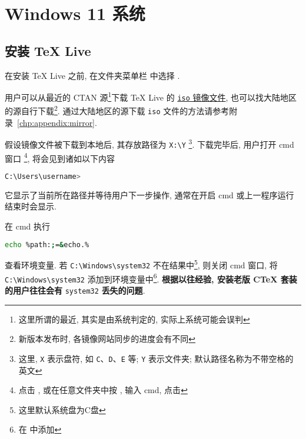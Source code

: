 
\chapter{Windows 11 系统}

\section{安装 \TeX{} Live}\label{sec:windows:install}

在安装 \TeX{} Live 之前,
在文件夹菜单栏  中选择 .

用户可以从最近的 CTAN 源\footnote{这里所谓的最近, 其实是由系统判定的, 实际上系统可能会误判}下载 \TeX{} Live 的
\href{https://mirrors.ctan.org/systems/texlive/Images/texlive2025.iso}{\texttt{iso} 镜像文件},
也可以找大陆地区的源自行下载\footnote{新版本发布时, 各镜像网站同步的进度会有不同}.
通过大陆地区的源下载 \texttt{iso} 文件的方法请参考附录~\ref{chp:appendix:mirror}.

假设镜像文件被下载到本地后,
其存放路径为 \texttt{X:\textbackslash Y}%
\footnote{这里, \texttt{X} 表示盘符,
如 \texttt{C}、\texttt{D}、\texttt{E} 等;
\texttt{Y} 表示文件夹;
默认路径名称为不带空格的英文}.
下载完毕后, 用户打开 \textsf{cmd} 窗口%
\footnote{点击 \keys{\faWindows},
或在任意文件夹中按 ,
输入 \textsf{cmd},
点击 \keys{\enter}},
将会见到诸如以下内容
\begin{lstlisting}[language = bash]
  C:\Users\username>
\end{lstlisting}
它显示了当前所在路径并等待用户下一步操作,
通常在开启 \textsf{cmd} 或上一程序运行结束时会显示.

在 \textsf{cmd} 执行
\begin{lstlisting}[language = bash]
  echo %path:;=&echo.%
\end{lstlisting}
查看环境变量. 
若 \texttt{C:\textbackslash Windows\textbackslash system32}
不在结果中\footnote{这里默认系统盘为\textsf{C}盘},
则关闭 \textsf{cmd} 窗口,
将 \texttt{C:\textbackslash Windows\textbackslash system32}
添加到环境变量中\footnote{在  中添加}.
\textbf{根据以往经验, 安装老版 C\TeX{} 套装的用户往往会有} \texttt{system32} \textbf{丢失的问题}. 

